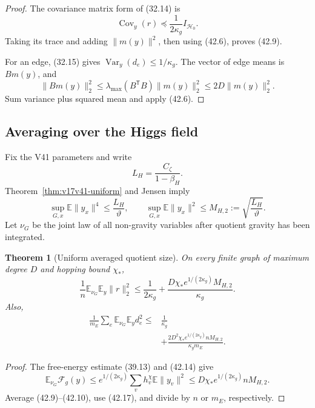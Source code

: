 \documentclass[11pt]{article}
\newtheorem{theorem}{Theorem}[section]
\theoremstyle{remark}
\begin{document}
\begin{proof}
The covariance matrix form of (32.14) is
\[
 \operatorname{Cov}_y(r)
 \preceq\frac1{2\kappa_g}I_{\mathcal H_0}.         \tag{42.11}
\]
Taking its trace and adding \(\|m(y)\|^2\), then using (42.6), proves
(42.9).

For an edge, (32.15) gives
\(\operatorname{Var}_y(d_e)\leq1/\kappa_g\).  The vector of edge means
is \(Bm(y)\), and
\[
 \|Bm(y)\|_2^2
 \leq\lambda_{\max}(B^{\mathsf T}B)\|m(y)\|_2^2
 \leq2D\|m(y)\|_2^2.                              \tag{42.12}
\]
Sum variance plus squared mean and apply (42.6).
\end{proof}

\subsection{Averaging over the Higgs field}

Fix the V41 parameters and write
\[
 L_H=\frac{C_\zeta}{1-\beta_H}.                    \tag{42.13}
\]
Theorem~\ref{thm:v17v41-uniform} and Jensen imply
\[
 \sup_{G,x}\mathbb E\|y_x\|^4
 \leq\frac{L_H}{\vartheta},
 \qquad
 \sup_{G,x}\mathbb E\|y_x\|^2
 \leq M_{H,2}:=\sqrt{\frac{L_H}{\vartheta}}.      \tag{42.14}
\]
Let \(\nu_G\) be the joint law of all non-gravity variables after
quotient gravity has been integrated.

\begin{theorem}[Uniform averaged quotient size]
\label{thm:v17v42-average}
On every finite graph of maximum degree \(D\) and hopping bound
\(\chi_*\),
\[
 \frac1n\mathbb E_{\nu_G}\mathbb E_y\|r\|_2^2
 \leq\frac1{2\kappa_g}
 +\frac{D\chi_*e^{1/(2\kappa_g)}M_{H,2}}{\kappa_g}.              \tag{42.15}
\]
Also,
\[
\begin{aligned}
 \frac1{m_E}\sum_e
 \mathbb E_{\nu_G}\mathbb E_y d_e^2
 \leq{}&\frac1{\kappa_g}\\
 &+\frac{2D^2\chi_*e^{1/(2\kappa_g)}nM_{H,2}}
 {\kappa_gm_E}.                                   \tag{42.16}
\end{aligned}
\]
\end{theorem}

\begin{proof}
The free-energy estimate (39.13) and (42.14) give
\[
 \mathbb E_{\nu_G}\mathcal F_g(y)
 \leq e^{1/(2\kappa_g)}
 \sum_vh_v^\chi\mathbb E\|y_v\|^2
 \leq D\chi_*e^{1/(2\kappa_g)}nM_{H,2}.           \tag{42.17}
\]
Average (42.9)--(42.10), use (42.17), and divide by \(n\) or
\(m_E\), respectively.
\end{proof}
\end{document}

